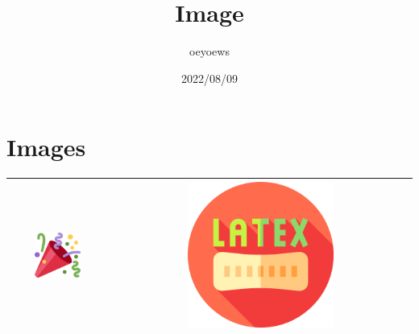 \documentclass{article}
\title{Image \emoji{book}}
\author{oeyoews}
\date{2022/08/09}
\begin{document}
\maketitle

\section{ Images}
\label{sec:img}

\begin{tabular}{|c|c|}\hline
	\includegraphics[width=0.5\textwidth]{tw-tada} &
  \includegraphics[width=0.5\textwidth]{latex} \\\hline
\end{tabular}
\end{document}
